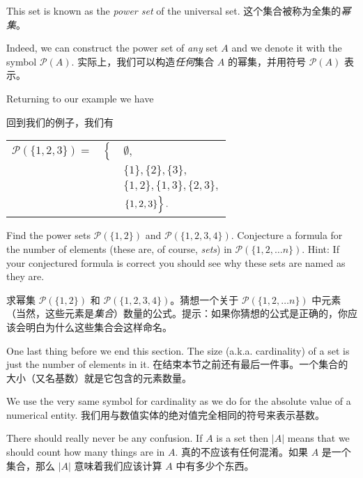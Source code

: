 This set is known as the 
\emph{power set} of the universal
set.
这个集合被称为全集的\emph{幂集}。

Indeed, we can construct the power set of \emph{any} set $A$ and
we denote it with the symbol ${\mathcal P}(A)$.
实际上，我们可以构造\emph{任何}集合 $A$ 的幂集，并用符号 ${\mathcal P}(A)$ 表示。

Returning to our
example we have 

回到我们的例子，我们有

\begin{center}
\begin{tabular}{rcl}
 ${\mathcal P}(\{1, 2, 3 \}) = $ & $\left\{ \rule{0pt}{10pt}  \right.$ & $\emptyset,$ \\
  & & $\{ 1 \},  \{ 2 \},  \{ 3 \},$ \\
  & & $\{ 1, 2 \},  \{ 1, 3 \},  \{ 2, 3 \},$ \\
  & & $\left. \{ 1, 2, 3 \} \rule{0pt}{10pt} \right\}.$
\end{tabular}
\end{center}

\begin{exer} \rule{0pt}{0pt}

Find the power sets $ {\mathcal P}(\{1, 2 \})$ and 
${\mathcal P}(\{1, 2, 3, 4 \})$.
Conjecture a formula for the number 
of elements (these are, of course, \emph{sets}) in 
${\mathcal P}(\{1, 2, \ldots n \})$.
Hint: If your conjectured formula is correct you should see 
why these sets are named as they are.

求幂集 $ {\mathcal P}(\{1, 2 \})$ 和 ${\mathcal P}(\{1, 2, 3, 4 \})$。猜想一个关于 ${\mathcal P}(\{1, 2, \ldots n \})$ 中元素（当然，这些元素是\emph{集合}）数量的公式。提示：如果你猜想的公式是正确的，你应该会明白为什么这些集合会这样命名。
\end{exer}

One last thing before we end this section.  The size (a.k.a. cardinality) of a set is just the number of elements in it.
在结束本节之前还有最后一件事。一个集合的大小（又名基数）就是它包含的元素数量。

We use the
very same symbol for cardinality as we do for the absolute value of a
numerical entity.
我们用与数值实体的绝对值完全相同的符号来表示基数。

There should really never be any confusion.  If $A$ is
a set then $|A|$ means that we should count how many things are in $A$.
真的不应该有任何混淆。如果 $A$ 是一个集合，那么 $|A|$ 意味着我们应该计算 $A$ 中有多少个东西。

